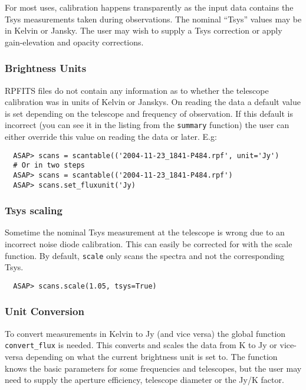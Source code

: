 \documentclass[11pt]{article}
\newcommand{\cmd}[1]{{\tt #1}}
\begin{document}
For most uses, calibration happens transparently as the input data
contains the Tsys measurements taken during observations. The nominal
``Tsys'' values may be in Kelvin or Jansky. The user may wish to
supply a Tsys correction or apply gain-elevation and opacity
corrections.

\subsubsection{Brightness Units}

RPFITS files do not contain any information as to whether the telescope
calibration was in units of Kelvin or Janskys.  On reading the data a
default value is set depending on the telescope and frequency of
observation.  If this default is incorrect (you can see it in the
listing from the \cmd{summary} function) the user can either override
this value on reading the data or later.  E.g:

\begin{verbatim}
  ASAP> scans = scantable(('2004-11-23_1841-P484.rpf', unit='Jy')
  # Or in two steps
  ASAP> scans = scantable(('2004-11-23_1841-P484.rpf')
  ASAP> scans.set_fluxunit('Jy)
\end{verbatim}

\subsubsection{Tsys scaling}

Sometime the nominal Tsys measurement at the telescope is wrong due to
an incorrect noise diode calibration. This can easily be corrected for
with the scale function. By default, \cmd{scale} only scans the
spectra and not the corresponding Tsys.

\begin{verbatim}
  ASAP> scans.scale(1.05, tsys=True)
\end{verbatim}

\subsubsection{Unit Conversion}

To convert measurements in Kelvin to Jy (and vice versa) the global
function \cmd{convert\_flux} is needed. This converts and scales the data
from K to Jy or vice-versa depending on what the current brightness unit is
set to. The function knows the basic parameters for some frequencies
and telescopes, but the user may need to supply the aperture
efficiency, telescope diameter or the Jy/K factor.
\end{document}
